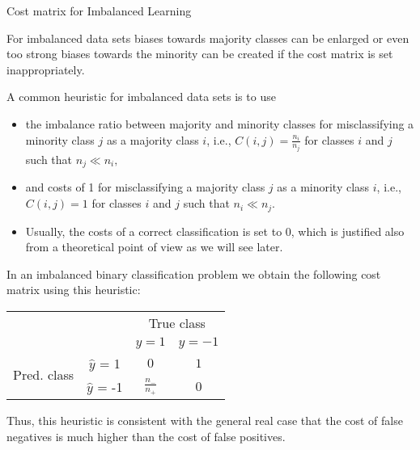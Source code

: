 \documentclass[11pt,compress,t,notes=noshow, xcolor=table]{beamer}
\begin{document}
\begin{vbframe}{Cost matrix for Imbalanced Learning}
	\footnotesize{
		\begin{itemize}
%			
			\item For imbalanced data sets biases towards majority classes can be enlarged or even too strong biases towards the minority can be created if the cost matrix is set inappropriately.
%			 
			\item A common heuristic for imbalanced data sets is to use 
%			
			\begin{itemize}
%				
				\footnotesize \item the imbalance ratio between majority and minority classes for misclassifying a minority class $j$ as a majority class $i$, i.e., $C(i,j) = \frac{n_i}{n_j}$ for classes $i$ and $j$ such that $n_j  \ll n_i,$  
%				
				\item and costs of 1 for misclassifying a majority class $j$ as a minority class $i$, i.e., $C(i,j) = 1$ for classes $i$ and $j$ such that $n_i \ll n_j.$ 
%				
				\item Usually, the costs of a correct classification is set to 0, which is justified also from a theoretical point of view as we will see later.
%				
			\end{itemize}
%
		\begin{minipage}{0.45\textwidth}    
					\item In an imbalanced binary classification problem we obtain the following cost matrix using this heuristic:
		\end{minipage}
%		
		\begin{minipage}{0.35\textwidth}    
						\hfill		
				\begin{tabular}{cc|cc}
					& &\multicolumn{2}{c}{True class} \\
					& & $y=1$ & $y=-1$  \\
					\hline
					\multirow{2}{*}{\parbox{0.3cm}{Pred.  class}}& $\hat y$ = 1     & $0$                & $ 1 $\\
					& $\hat y$ = -1 & $ \frac{n_-}{n_+} $              &  $0$   \\
				\end{tabular}
		\end{minipage}
	\item Thus, this heuristic is consistent with the general real case that the cost of false negatives is much higher than the cost of false positives.	
%	
%	
	\end{itemize}
		
	}
\end{vbframe}
\end{document}
